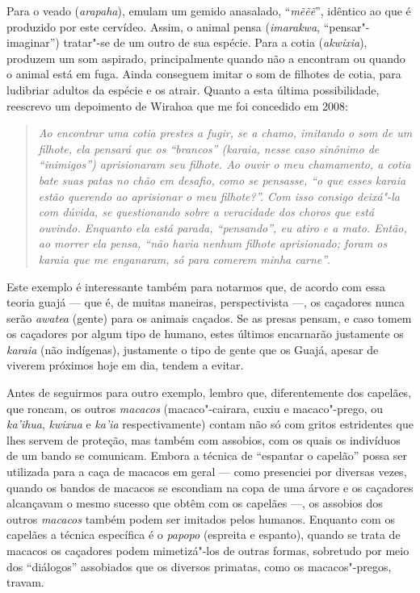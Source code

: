 Para o veado (\emph{arapaha}), emulam um gemido anasalado,
``\emph{mẽẽẽ}'', idêntico ao que é produzido por este cervídeo. Assim, o
animal pensa (\emph{imarakwa}, ``pensar"-imaginar'') tratar"-se de um
outro de sua espécie. Para a cotia (\emph{akwixia}), produzem um som
aspirado, principalmente quando não a encontram ou quando o animal está
em fuga. Ainda conseguem imitar o som de filhotes de cotia, para
ludibriar adultos da espécie e os atrair. Quanto a esta última
possibilidade, reescrevo um depoimento de Wirahoa que me foi concedido
em 2008:

\begin{quote}
\emph{Ao encontrar uma cotia prestes a fugir, se a chamo, imitando o som de
um filhote, ela pensará que os ``brancos'' (\emph{karaia}, nesse caso
sinônimo de ``inimigos'') aprisionaram seu filhote. Ao ouvir o meu
chamamento, a cotia bate suas patas no chão em desafio, como se
pensasse, ``o que esses \emph{karaia} estão querendo ao aprisionar o meu
filhote?''. Com isso consigo deixá"-la com dúvida, se questionando sobre a
veracidade dos choros que está ouvindo. Enquanto ela está parada,
``pensando'', eu atiro e a mato. Então, ao morrer ela pensa, ``não havia
nenhum filhote aprisionado; foram os \emph{karaia} que me enganaram, só
para comerem minha carne''}.
\end{quote}

Este exemplo é interessante também para notarmos que, de acordo com essa
teoria guajá --- que é, de muitas maneiras, perspectivista ---, os caçadores
nunca serão \emph{awatea} (gente) para os animais caçados. Se as presas
pensam, e caso tomem os caçadores por algum tipo de humano, estes
últimos encarnarão justamente os \emph{karaia} (não indígenas),
justamente o tipo de gente que os Guajá, apesar de viverem próximos hoje
em dia, tendem a evitar.

Antes de seguirmos para outro exemplo, lembro que, diferentemente dos
capelães, que roncam, os outros \emph{macacos} (macaco"-cairara, cuxiu e
macaco"-prego, ou \emph{ka'ihua}, \emph{kwixua} e \emph{ka'ia}
respectivamente) contam não só com gritos estridentes que lhes servem de
proteção, mas também com assobios, com os quais os indivíduos de um
bando se comunicam. Embora a técnica de ``espantar o capelão'' possa ser
utilizada para a caça de macacos em geral --- como presenciei por diversas
vezes, quando os bandos de macacos se escondiam na copa de uma árvore e
os caçadores alcançavam o mesmo sucesso que obtêm com os capelães ---, os
assobios dos outros \emph{macacos} também podem ser imitados pelos
humanos. Enquanto com os capelães a técnica específica é o \emph{papopo}
(espreita e espanto), quando se trata de macacos os caçadores podem
mimetizá"-los de outras formas, sobretudo por meio dos ``diálogos''
assobiados que os diversos primatas, como os macacos"-pregos, travam.

